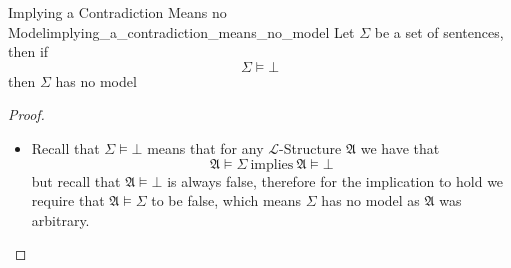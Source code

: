 \begin{proposition}{Implying a Contradiction Means no Model}{implying_a_contradiction_means_no_model}
Let $ \Sigma  $ be a set of sentences, then if 
\[
\Sigma \models \bot 
\]
then $ \Sigma  $ has no model
\end{proposition}
\begin{proof}
    \begin{itemize}
        \item Recall that $ \Sigma \models \bot  $ means that for any $\mathcal{L}$-Structure $ \mathfrak{ A }   $ we have that 
            \[
            \mathfrak{ A } \models \Sigma ~\text{implies}~ \mathfrak{ A } \models \bot    
            \]
            but recall that $ \mathfrak{ A } \models \bot   $ is always false, therefore for the implication to hold we require that $ \mathfrak{ A } \models \Sigma   $ to be false, which means $ \Sigma  $ has no model as $ \mathfrak{ A }   $ was arbitrary.
    \end{itemize}
\end{proof}
